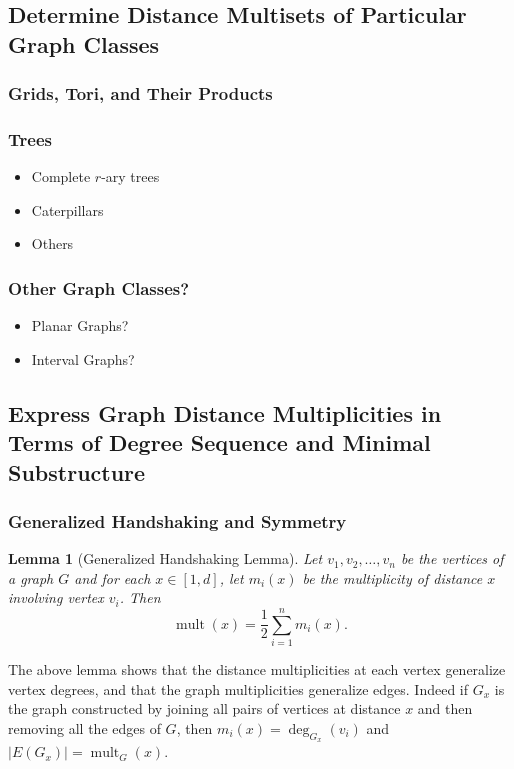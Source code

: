 \documentclass[12]{article}
\DeclareMathOperator{\mult}{mult}
\newtheorem{lem}{Lemma} %
\theoremstyle{definition}
\begin{document}
	\subsection{Determine Distance Multisets of Particular Graph Classes}
	\subsubsection{Grids, Tori, and Their Products}
	
	\subsubsection{Trees}
	\begin{itemize}
		\item Complete $r$-ary trees
		\item Caterpillars
		\item Others
	\end{itemize}
	
	\subsubsection{Other Graph Classes?}
	\begin{itemize}
		\item Planar Graphs?
		\item Interval Graphs?
	\end{itemize}
	
	\subsection{Express Graph Distance Multiplicities in Terms of Degree Sequence and Minimal Substructure}
	\subsubsection{Generalized Handshaking and Symmetry}
	
	\begin{lem}[Generalized Handshaking Lemma]
		Let $v_1, v_2, \ldots, v_n$ be the vertices of a graph $G$ and for each $x \in [1,d]$, let $m_i(x)$ be the multiplicity of distance $x$ involving vertex $v_i$.  Then 
		$$\mult(x) = \frac{1}{2}\sum_{i = 1}^n m_i(x).$$
	\end{lem}
	The above lemma shows that the distance multiplicities at each vertex generalize vertex degrees, and that the graph multiplicities generalize edges.  Indeed if $G_x$ is the graph constructed by joining all pairs of vertices at distance $x$ and then removing all the edges of $G$, then $m_i(x) = \deg_{G_x}(v_i)$ and $|E(G_x)| = \mult_G(x)$.
	
\end{document}
